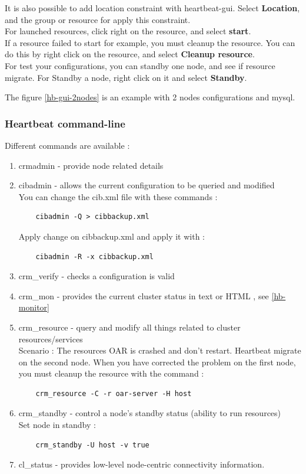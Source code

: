 \documentclass[a4paper,10pt]{report}
\begin{document}
It is also possible to add location constraint with heartbeat-gui. Select \textbf{Location}, and the group or resource for apply this constraint.\\

For launched resources, click right on the resource, and select \textbf{start}.\\

If a resource failed to start for example, you must cleanup the resource. You can do this by right click on the resource, and select \textbf{Cleanup resource}.\\

For test your configurations, you can standby one node, and see if resource migrate. For Standby a node, right click on it and select \textbf{Standby}.

The figure \ref{hb-gui-2nodes} is an example with 2 nodes configurations and mysql.

\subsubsection{Heartbeat command-line}
\label{hb-command}
Different commands are available : 
\begin{enumerate}
 \item crmadmin - provide node related details 
 \item cibadmin - allows the current configuration to be queried and modified \\
    You can change the cib.xml file with these commands :
    \begin{lstlisting}
    cibadmin -Q > cibbackup.xml 
    \end{lstlisting}
  Apply change on cibbackup.xml and apply it with :
    \begin{lstlisting}
    cibadmin -R -x cibbackup.xml 
    \end{lstlisting}

 \item crm\_verify - checks a configuration is valid 
 \item crm\_mon - provides the current cluster status in text or HTML , see \ref{hb-monitor}
 \item crm\_resource - query and modify all things related to cluster resources/services\\
    Scenario : The resources OAR is crashed and don't restart. Heartbeat migrate on the second node. When you have corrected the problem on the first node, you must cleanup the resource with the command :
    \begin{lstlisting}
    crm_resource -C -r oar-server -H host
    \end{lstlisting}
 \item crm\_standby - control a node's standby status (ability to run resources) \\
    Set node in standby :
    \begin{lstlisting}
    crm_standby -U host -v true 
    \end{lstlisting}
 \item cl\_status - provides low-level node-centric connectivity information. 
\end{enumerate}
\end{document}

